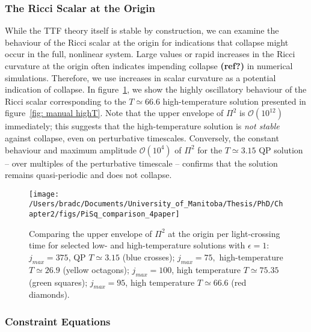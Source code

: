 \documentclass[../PhD.tex]{subfiles}
\begin{document}
\subsubsection{The Ricci Scalar at the Origin}

While the TTF theory itself is stable by construction, we can examine the behaviour of the Ricci scalar at the origin for indications that collapse might occur in the full, nonlinear system. Large values or rapid increases in the Ricci curvature at the origin often indicates impending collapse {\bf (ref?)} in numerical simulations. Therefore, we use increases in scalar curvature as a potential indication of collapse. In figure~\ref{fig: compare Pi sq}, we show the highly oscillatory behaviour of the Ricci scalar corresponding to the $T\simeq 66.6$ high-temperature solution presented in figure~\ref{fig: manual highT}. Note that the upper envelope of $\Pi^2$ is $\mathcal{O}(10^{12})$ immediately; this suggests that the high-temperature solution is \emph{not stable} against collapse, even on perturbative timescales. Conversely, the constant behaviour and maximum amplitude $\mathcal{O}(10^4)$ of $\Pi^2$ for the $T \simeq 3.15$ QP solution -- over multiples of the perturbative timescale -- confirms that the solution remains quasi-periodic and does not collapse.

\begin{figure}[h]
	\centering
	\texttt{[image: /Users/bradc/Documents/University\_of\_Manitoba/Thesis/PhD/Chapter2/figs/PiSq\_comparison\_4paper]}
	\caption[Upper envelope of $\Pi^2$ at the origin for selected low- and high-temperature QP solutions]{Comparing the upper envelope of $\Pi^2$ at the origin per light-crossing time for selected low- and high-temperature solutions with $\epsilon = 1$: $j_{max} = 375$, QP $T \simeq 3.15$ (blue crosses); $j_{max} = 75,$ high-temperature $T \simeq 26.9$ (yellow octagons); $j_{max} = 100$, high temperature $T \simeq 75.35$ (green squares); $j_{max} = 95$, high temperature $T \simeq 66.6$ (red diamonds).}
	\label{fig: compare Pi sq}
\end{figure}


\subsubsection{Constraint Equations}
\end{document}
